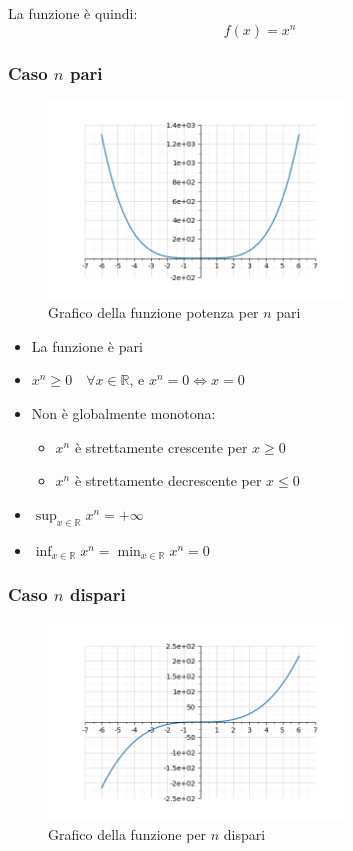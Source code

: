 La funzione è quindi:
\[
f(x) = x^n
\]

\subsubsection{Caso $n$ pari}
\begin{figure}[H]
    \centering
    \includegraphics[width=0.7\textwidth]{./img/esponente_pari.png}
    \caption{Grafico della funzione potenza per $n$ pari}
    \label{fig:esponente_pari}
\end{figure}
\FloatBarrier{}

\begin{itemize}
  \item La funzione è pari
  \item $x^n \geq 0 \quad \forall x \in \mathbb{R}$, e $x^n = 0 \iff x = 0$
  \item Non è globalmente monotona:
  \begin{itemize}
    \item $x^n$ è strettamente crescente per $x \geq 0$
    \item $x^n$ è strettamente decrescente per $x \leq 0$
  \end{itemize}
  \item $\displaystyle \sup_{x \in \mathbb{R}} x^n = +\infty$
  \item $\displaystyle \inf_{x \in \mathbb{R}} x^n = \min_{x \in \mathbb{R}} x^n = 0$
\end{itemize}


\subsubsection{Caso $n$ dispari}

\begin{figure}[H]
    \centering
    \includegraphics[width=0.7\textwidth]{./img/esponente_dispari.png}
    \caption{Grafico della funzione per $n$ dispari}
    \label{fig:esponente_dispari}
\end{figure}
\FloatBarrier
  
